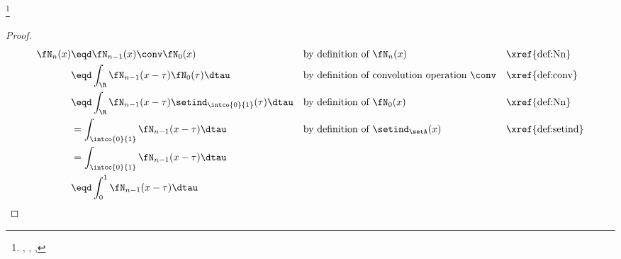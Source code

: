 \begin{lemma}
\footnote{
  ,
  ,
  ,
  }
\label{lem:Nn}
\end{lemma}
\begin{proof}
  \begin{align*}
    \fN_{n}(x)
      &\eqd \fN_{n-1}(x)\conv\fN_0(x)
      && \text{by definition of $\fN_n(x)$} 
      && \text{\xref{def:Nn}}
    \\&\eqd \int_\R\fN_{n-1}(x-\tau)\fN_0(\tau)\dtau
      && \text{by definition of convolution operation $\conv$} 
      && \text{\xref{def:conv}}
    \\&\eqd \int_\R\fN_{n-1}(x-\tau)\setind_\intco{0}{1}(\tau)  \dtau
      && \text{by definition of $\fN_0(x)$} 
      && \text{\xref{def:Nn}}
    \\&= \int_\intco{0}{1} \fN_{n-1}(x-\tau)\dtau
      && \text{by definition of $\setind_\setA(x)$} 
      && \text{\xref{def:setind}}
    \\&= \int_\intcc{0}{1} \fN_{n-1}(x-\tau)\dtau
    \\&\eqd \int_0^1 \fN_{n-1}(x-\tau)\dtau
  \end{align*}
\end{proof}


